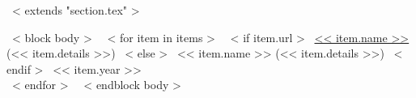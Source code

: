 ~< extends "section.tex" >~

~< block body >~
~< for item in items >~
  ~< if item.url >~
    \href{<< item.url >>}{<< item.name >>} (<< item.details >>)
  ~< else >~
    << item.name >> (<< item.details >>)
  ~< endif >~
  \hfill << item.year >> \\
~< endfor >~
~< endblock body >~
